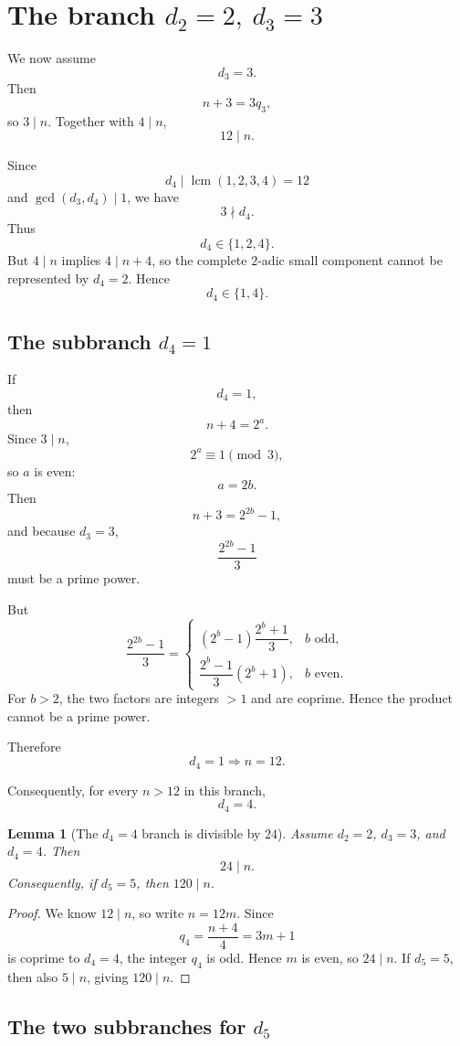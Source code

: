 \documentclass[11pt]{article}
\newtheorem{lemma}[theorem]{Lemma}
\begin{document}
\section{The branch \(d_2=2,\ d_3=3\)}

We now assume
\[
d_3=3.
\]
Then
\[
n+3=3q_3,
\]
so \(3\mid n\). Together with \(4\mid n\),
\[
\boxed{12\mid n.}
\tag{26}
\]

Since
\[
d_4\mid\operatorname{lcm}(1,2,3,4)=12
\]
and \(\gcd(d_3,d_4)\mid1\),
we have
\[
3\nmid d_4.
\]
Thus
\[
d_4\in\{1,2,4\}.
\]
But \(4\mid n\) implies \(4\mid n+4\), so the complete \(2\)-adic small
component cannot be represented by \(d_4=2\). Hence
\[
\boxed{d_4\in\{1,4\}.}
\tag{27}
\]

\subsection{The subbranch \(d_4=1\)}

If
\[
d_4=1,
\]
then
\[
n+4=2^a.
\]
Since \(3\mid n\),
\[
2^a\equiv1\pmod3,
\]
so \(a\) is even:
\[
a=2b.
\]
Then
\[
n+3=2^{2b}-1,
\]
and because \(d_3=3\),
\[
\frac{2^{2b}-1}{3}
\]
must be a prime power.

But
\[
\frac{2^{2b}-1}{3}
=
\begin{cases}
(2^b-1)\dfrac{2^b+1}{3},&b\text{ odd},\\[1.2ex]
\dfrac{2^b-1}{3}(2^b+1),&b\text{ even}.
\end{cases}
\tag{28}
\]
For \(b>2\), the two factors are integers \(>1\) and are coprime.  Hence
the product cannot be a prime power.

Therefore
\[
\boxed{d_4=1\Longrightarrow n=12.}
\tag{29}
\]

Consequently, for every \(n>12\) in this branch,
\[
\boxed{d_4=4.}
\tag{30}
\]


\begin{lemma}[The $d_4=4$ branch is divisible by $24$]
\label{lem:24div}
Assume $d_2=2$, $d_3=3$, and $d_4=4$.  Then
\[
\boxed{24\mid n}.
\]
Consequently, if $d_5=5$, then $120\mid n$.
\end{lemma}

\begin{proof}
We know $12\mid n$, so write $n=12m$.  Since
\[
q_4=\frac{n+4}{4}=3m+1
\]
is coprime to $d_4=4$, the integer $q_4$ is odd.  Hence $m$ is even,
so $24\mid n$.  If $d_5=5$, then also $5\mid n$, giving $120\mid n$.
\end{proof}

\subsection{The two subbranches for \(d_5\)}
\end{document}
